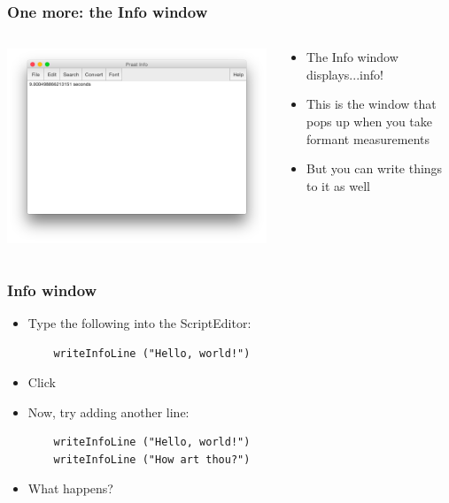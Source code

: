 \documentclass[handout]{beamer}
\begin{document}
\begin{frame}[fragile]
\frametitle{One more: the Info window}

\begin{columns}[]
    \begin{column}{0.5\textwidth}
        \includegraphics[width=\textwidth]{graphics/infowindow.png}
    \end{column}

    \begin{column}{0.5\textwidth}
        \begin{itemize}
            \item <1-> The Info window displays...info!
            \item <2-> This is the window that pops up when you take formant measurements
            \item <2-> But you can write things to it as well
        \end{itemize}
    \end{column}
\end{columns}
\end{frame}

\begin{frame}[fragile]
\frametitle{Info window}
\begin{itemize}
    \item <1-> Type the following into the ScriptEditor:
    \begin{verbatim}
    writeInfoLine ("Hello, world!")\end{verbatim}
    \item <1-> Click 

    \item <2-> Now, try adding another line:
    \begin{verbatim}
    writeInfoLine ("Hello, world!")
    writeInfoLine ("How art thou?")\end{verbatim}
    \item <2-> What happens?
\end{itemize}
\end{frame}
\end{document}
